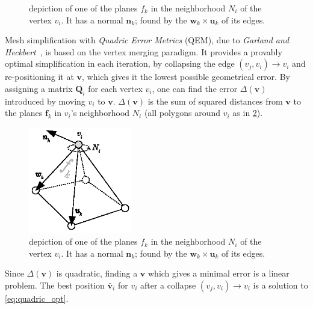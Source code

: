 \begin{figure}[h]
\begin{minipage}{0.485\textwidth}
        \caption{depiction of one of the planes \(f_k\) in the neighborhood \(N_i\) of the vertex \(v_i\). It has a normal \(\mathbf{n}_k\); found by the \(\mathbf{w}_k \times \mathbf{u}_k\) of its edges.}
        \label{fig:quadrics}
    \end{minipage}
\end{figure}
\fi %



Mesh simplification with \emph{Quadric Error Metrics} (QEM), due to \emph{Garland and Heckbert}~\cite{garland1997surface}, is based on the vertex merging paradigm. It provides a provably optimal simplification in each iteration, by collapsing the edge \((v_j, v_i) \rightarrow v_i\) and re-positioning it at \(\mathbf{v}\), which gives it the lowest possible geometrical error. By assigning a matrix \(\mathbf{Q}_i\) for each vertex \(v_i\), one can find the error \(\Delta(\mathbf{v})\) introduced by moving \(v_i\) to \(\mathbf{v}\). \(\Delta(\mathbf{v})\) is the sum of squared distances from \(\mathbf{v}\) to the planes \(\mathbf{f}_k\) in \(v_i\)'s neighborhood \(N_i\) (all polygons around \(v_i\) as in \cref{fig:quadrics}).

\begin{figure}[h]
  \centering
  \includegraphics[width=0.4\textwidth]{figures/quadric_planes.eps}
  \caption{depiction of one of the planes \(f_k\) in the neighborhood \(N_i\) of the vertex \(v_i\). It has a normal \(\mathbf{n}_k\); found by the \(\mathbf{w}_k \times \mathbf{u}_k\) of its edges.}
  \label{fig:quadrics}
\end{figure}


Since \(\Delta(\mathbf{v})\) is quadratic, finding a \(\mathbf{v}\) which gives a minimal error is a linear problem. The best position \(\mathbf{\bar{v}}_i\) for \(v_i\) after a collapse \((v_j, v_i) \rightarrow v_i\) is a solution to \cref{eq:quadric_opt}.

